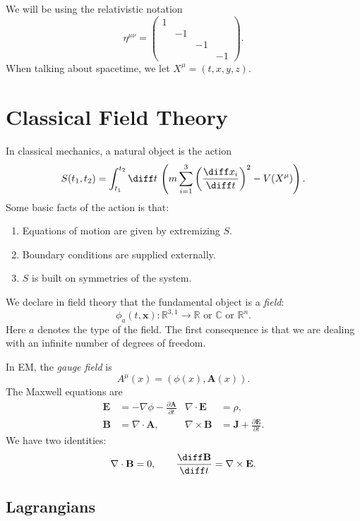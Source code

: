 \documentclass[12pt]{article}
\begin{document}
We will be using the relativistic notation
\[
\eta^{\mu\nu} =
\begin{pmatrix}
	1 & & & \\ & -1 & & \\ & & -1 & \\ & & & -1
\end{pmatrix}.
\]
When talking about spacetime, we let $X^\mu = (t, x, y, z)$.

\newpage

\section{Classical Field Theory}%
\label{sec:classical_ft}

In classical mechanics, a natural object is the action
\[
	S(t_1, t_2) = \int_{t_1}^{t_2} \diff t \, \left( m \sum_{i = 1}^3 \left( \frac{\diff x_i}{\diff t} \right)^2 - V(X^\mu) \right).
\]
Some basic facts of the action is that:
\begin{enumerate}
	\item Equations of motion are given by extremizing $S$.
	\item Boundary conditions are supplied externally.
	\item $S$ is built on symmetries of the system.
\end{enumerate}

We declare in field theory that the fundamental object is a \emph{field}:
\[
	\phi_a(t, \mathbf{x}) : \mathbb{R}^{3, 1} \to \mathbb{R} \text{ or } \mathbb{C} \text{ or } \mathbb{R}^n.
\]
Here $a$ denotes the type of the field. The first consequence is that we are dealing with an infinite number of degrees of freedom.

\begin{exbox}[Electromagnetism]
	In EM, the \emph{gauge field} is
	\[
	A^\mu(x) = (\phi(x), \mathbf{A}(x)).
	\]
	The Maxwell equations are
	\begin{align*}
		\mathbf{E} &= - \nabla \phi - \frac{\partial \mathbf{A}}{\partial t} & \nabla \cdot \mathbf{E} &= \rho, \\
		\mathbf{B} &= \nabla \cdot \mathbf{A}, & \nabla \times \mathbf{B} &= \mathbf{J} + \frac{\partial \mathbf{E}}{\partial t}.
	\end{align*}
	We have two identities:
	\[
	\nabla \cdot \mathbf{B} = 0, \qquad \frac{\diff \mathbf{B}}{\diff t} = \nabla \times \mathbf{E}.
	\]
\end{exbox}

\subsection{Lagrangians}%
\label{sub:lag}
\end{document}
